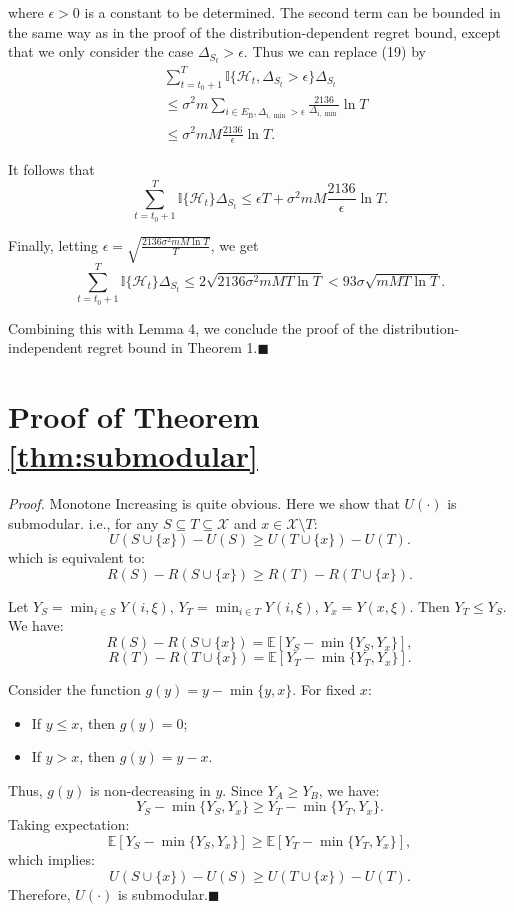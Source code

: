 \documentclass[opre,sglanonrev]{informs4}
\begin{document}
where $\epsilon>0$ is a constant to be determined. The second term can be bounded in the same way as in the proof of the distribution-dependent regret bound, except that we only consider the case $\Delta_{S_t}>\epsilon$. Thus we can replace (19) by
\begin{equation}
	\begin{aligned}
		&\sum_{t=t_0+1}^T\mathbb{I}\{\mathcal{H}_t,\Delta_{S_t}>\epsilon\}\Delta_{S_t}\\
		&\leq \sigma^2m\sum_{i\in E_\mathrm{B},\Delta_{i,\min}>\epsilon}\frac{2136}{\Delta_{i,\min}}\ln T\\
		&\leq \sigma^2mM\frac{2136}{\epsilon}\ln T.
	\end{aligned}
\end{equation}

It follows that
$$\sum_{t=t_0+1}^T\mathbb{I}\{\mathcal{H}_t\}\Delta_{S_t}\leq\epsilon T+\sigma^2mM\frac{2136}{\epsilon}\ln T.$$

Finally, letting $\epsilon=\sqrt{\frac{2136\sigma^2mM\ln T}{T}}$, we get 
$$\sum_{t=t_0+1}^T\mathbb{I}\{\mathcal{H}_t\}\Delta_{S_t}\leq2\sqrt{2136\sigma^2mMT\ln T}<93\sigma\sqrt{mMT\ln T}.$$

Combining this with Lemma 4, we conclude the proof of the distribution-independent regret bound in Theorem 1.\hfill $\blacksquare$

\section{Proof of Theorem \ref{thm:submodular}}
\textit{Proof.} Monotone Increasing is quite obvious. Here we show that $U(\cdot)$ is submodular. i.e., for any $S \subseteq T \subseteq \mathcal{X}$ and $x \in \mathcal{X} \setminus T$:
$$
U(S \cup \{x\}) - U(S) \geq U(T \cup \{x\}) - U(T).
$$
which is equivalent to:
$$
R(S)-R(S \cup \{x\}) \geq R(T) - R(T \cup \{x\}).
$$

Let $Y_S = \min_{i \in S} Y(i,\xi)$, $Y_T = \min_{i \in T} Y(i,\xi)$, $Y_x = Y(x,\xi)$. Then $Y_T \leq Y_S$. We have:
\[
R(S) - R(S \cup \{x\}) = \mathbb{E}\left[Y_S - \min\{Y_S, Y_x\}\right],
\]
\[
R(T) - R(T \cup \{x\}) = \mathbb{E}\left[Y_T - \min\{Y_T, Y_x\}\right].
\]

Consider the function $g(y) = y - \min\{y, x\}$. For fixed $x$:
\begin{itemize}
    \item If $y \leq x$, then $g(y) = 0$;
    \item If $y > x$, then $g(y) = y - x$.
\end{itemize}
Thus, $g(y)$ is non-decreasing in $y$. Since $Y_A \geq Y_B$, we have:
\[
Y_S - \min\{Y_S, Y_x\} \geq Y_T - \min\{Y_T, Y_x\}.
\]
Taking expectation:
\[
\mathbb{E}\left[Y_S - \min\{Y_S, Y_x\}\right] \geq \mathbb{E}\left[Y_T - \min\{Y_T, Y_x\}\right],
\]
which implies:
$$
U(S \cup \{x\}) - U(S) \geq U(T \cup \{x\}) - U(T).
$$
Therefore, $U(\cdot)$ is submodular.\hfill $\blacksquare$

\end{document}
